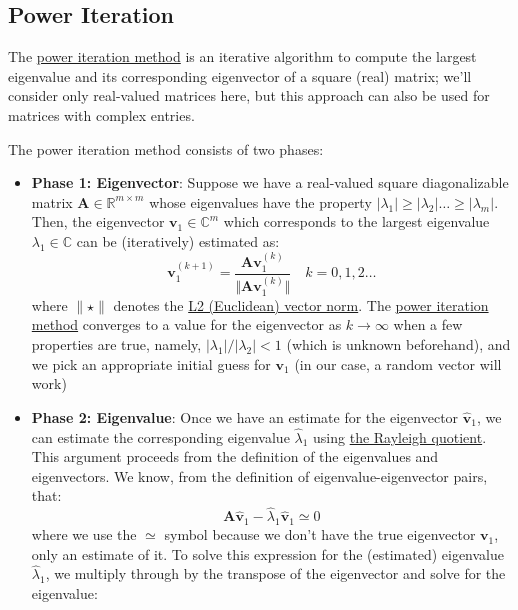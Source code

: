 \documentclass{article}[11pt]
\begin{document}
\subsection{Power Iteration}
The \href{https://en.wikipedia.org/wiki/Power_iteration}{power iteration method} 
is an iterative algorithm to compute the largest eigenvalue and its corresponding eigenvector of a square (real) matrix; we'll consider only real-valued matrices here, 
but this approach can also be used for matrices with complex entries. 

\begin{mdframed}
The power iteration method consists of two phases:
\begin{itemize}[leftmargin=16pt]
\item{\textbf{Phase 1: Eigenvector}: Suppose we have a real-valued square diagonalizable matrix $\mathbf{A}\in\mathbb{R}^{m\times{m}}$ whose eigenvalues have the property $|\lambda_{1}|\geq|\lambda_{2}|\dots\geq|\lambda_{m}|$. 
   Then, the eigenvector $\mathbf{v}_{1}\in\mathbb{C}^{m}$ which corresponds to the largest eigenvalue $\lambda_{1}\in\mathbb{C}$ can be (iteratively) estimated as:
   \begin{equation}
      \mathbf{v}_{1}^{(k+1)} = \frac{\mathbf{A}\mathbf{v}_{1}^{(k)}}{\Vert \mathbf{A}\mathbf{v}_{1}^{(k)} \Vert}\quad{k=0,1,2\dots}
   \end{equation}
   where $\lVert \star \rVert$ denotes the \href{https://mathworld.wolfram.com/L2-Norm.html}{L2 (Euclidean) vector norm}. 
   The \href{https://en.wikipedia.org/wiki/Power_iteration}{power iteration method} converges to a value for the eigenvector as $k\rightarrow\infty$ 
   when a few properties are true, namely, $|\lambda_{1}|/|\lambda_{2}| < 1$ (which is unknown beforehand), and we pick an appropriate initial guess for $\mathbf{v}_{1}$ (in our case, a random vector will work)
}
\item{\textbf{Phase 2: Eigenvalue}: Once we have an estimate for the eigenvector $\hat{\mathbf{v}}_{1}$, we can estimate the corresponding eigenvalue $\hat{\lambda}_{1}$ using \href{https://en.wikipedia.org/wiki/Rayleigh_quotient}{the Rayleigh quotient}. 
   This argument proceeds from the definition of the eigenvalues and eigenvectors. We know, from the definition of eigenvalue-eigenvector pairs, that:
   \begin{equation}
      \mathbf{A}\hat{\mathbf{v}}_{1} - \hat{\lambda}_{1}\hat{\mathbf{v}}_{1}\simeq{0}
   \end{equation}
where we use the $\simeq$ symbol because we don't have the true eigenvector $\mathbf{v}_{1}$, only an estimate of it. To solve this expression for the (estimated) eigenvalue $\hat{\lambda}_{1}$, we multiply through by the transpose of the eigenvector and solve for the eigenvalue:
}
\end{itemize}
\end{mdframed}
\end{document}
